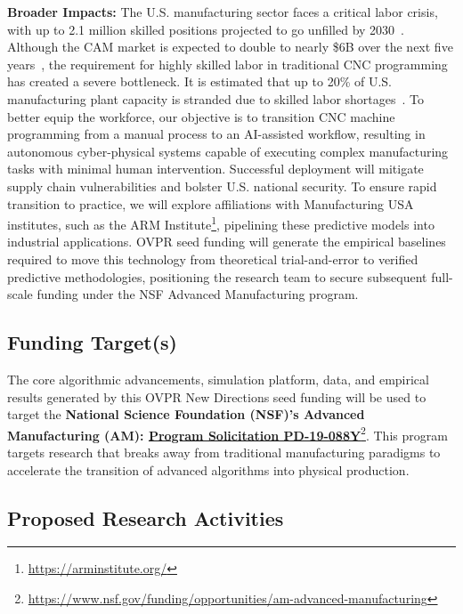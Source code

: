 \documentclass[11pt, letterpaper]{article}
\begin{document}
\textbf{Broader Impacts:}
The U.S. manufacturing sector faces a critical labor crisis, with up to 2.1 million skilled positions projected to go unfilled by 2030~\cite{deloitteCreatingPathways}.
Although the CAM market is expected to double to nearly \$6B over the next five years~\cite{mordorintelligenceComputerAided}, the requirement for highly skilled labor in traditional CNC programming has created a severe bottleneck.
It is estimated that up to 20\% of U.S. manufacturing plant capacity is stranded due to skilled labor shortages~\cite{randstadusa2026Skilled}.
To better equip the workforce, our objective is to transition CNC machine programming from a manual process to an AI-assisted workflow, resulting in autonomous cyber-physical systems capable of executing complex manufacturing tasks with minimal human intervention.
Successful deployment will mitigate supply chain vulnerabilities and bolster U.S. national security.
To ensure rapid transition to practice, we will explore affiliations with Manufacturing USA institutes, such as the ARM Institute\footnote{\url{https://arminstitute.org/}}, pipelining these predictive models into industrial applications.
OVPR seed funding will generate the empirical baselines required to move this technology from theoretical trial-and-error to verified predictive methodologies, positioning the research team to secure subsequent full-scale funding under the NSF Advanced Manufacturing program.

\subsection*{Funding Target(s)}

The core algorithmic advancements, simulation platform, data, and empirical results generated by this OVPR New Directions seed funding will be used to target the \textbf{National Science Foundation (NSF)'s Advanced Manufacturing (AM): \href{https://www.grants.gov/search-results-detail/306824}{Program Solicitation PD-19-088Y}}\footnote{\url{https://www.nsf.gov/funding/opportunities/am-advanced-manufacturing}}.
This program targets research that breaks away from traditional manufacturing paradigms to accelerate the transition of advanced algorithms into physical production.

\subsection*{Proposed Research Activities}
\end{document}
